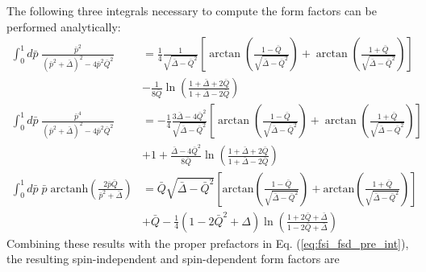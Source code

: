 \documentclass[12pt,letterpaper]{book}
\begin{document}
The following three integrals necessary to compute the form factors can be performed analytically:
\begin{equation}
\begin{split}
\int_0^1 d\bar{p}\;\frac{\bar{p}^2}{(\bar{p}^2+\bar{\Delta})^2-4\bar{p}^2\bar{Q}^2}&=\frac{1}{4}\frac{1}{\sqrt{\bar{\Delta}-\bar{Q}^2}}\left[\arctan\left(\frac{1-\bar{Q}}{\sqrt{\bar{\Delta}-\bar{Q}^2}}\right)+\arctan\left(\frac{1+\bar{Q}}{\sqrt{\bar{\Delta}-\bar{Q}^2}}\right)\right]\\
&-\frac{1}{8\bar{Q}}\ln\left(\frac{1+\bar{\Delta}+2\bar{Q}}{1+\bar{\Delta}-2\bar{Q}}\right)\\
\int_0^1 d\bar{p}\;\frac{\bar{p}^4}{(\bar{p}^2+\bar{\Delta})^2-4\bar{p}^2\bar{Q}^2}&=-\frac{1}{4}\frac{3\bar{\Delta}-4\bar{Q}^2}{\sqrt{\bar{\Delta}-\bar{Q}^2}}\left[\arctan\left(\frac{1-\bar{Q}}{\sqrt{\bar{\Delta}-\bar{Q}^2}}\right)+\arctan\left(\frac{1+\bar{Q}}{\sqrt{\bar{\Delta}-\bar{Q}^2}}\right)\right]\\
&+1+\frac{\bar{\Delta}-4\bar{Q}^2}{8\bar{Q}}\ln\left(\frac{1+\bar{\Delta}+2\bar{Q}}{1+\bar{\Delta}-2\bar{Q}}\right)\\
\int_0^1d\bar{p}\;\bar{p}\;\mathrm{arctanh}\left(\frac{2\bar{p}\bar{Q}}{\bar{p}^2+\bar{\Delta}}\right)&=\bar{Q}\sqrt{\bar{\Delta}-\bar{Q}^2}\left[\mathrm{arctan}\left(\frac{1-\bar{Q}}{\sqrt{\bar{\Delta}-\bar{Q}^2}}\right)+\mathrm{arctan}\left(\frac{1+\bar{Q}}{\sqrt{\bar{\Delta}-\bar{Q}^2}}\right)\right]\\
&+\bar{Q}-\frac{1}{4}\left(1-2\bar{Q}^2+\Delta\right)\ln\left(\frac{1+2\bar{Q}+\bar{\Delta}}{1-2\bar{Q}+\bar{\Delta}}\right)
\end{split}
\end{equation}
Combining these results with the proper prefactors in Eq. (\ref{eq:fsi_fsd_pre_int}), the resulting spin-independent and spin-dependent form factors are 
\end{document}
